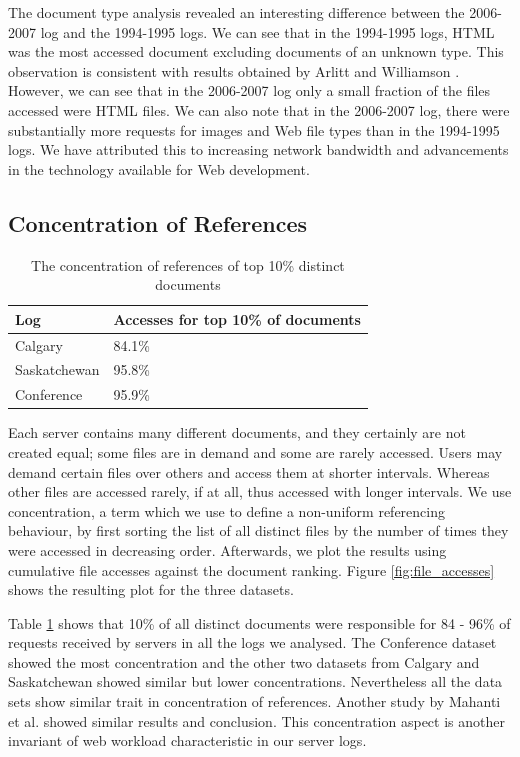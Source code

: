 \documentclass[10pt,conference]{IEEEtran}
\begin{document}
The document type analysis revealed an interesting difference between the 2006-2007 log and the 1994-1995 logs. We can see that in the 1994-1995 logs, HTML was the most accessed document excluding documents of an unknown type. This observation is consistent with results obtained by Arlitt and Williamson \cite{keynote}. However, we can see that in the 2006-2007 log only a small fraction of the files accessed were HTML files. We can also note that in the 2006-2007 log, there were substantially more requests for images and Web file types than in the 1994-1995 logs. We have attributed this to increasing network bandwidth and advancements in the technology available for Web development.

\subsection{Concentration of References} %
\label{sub:concentration_of_references}
\begin{table}[h]
    \caption{The concentration of references of top 10\% distinct documents}\label{tab:conc_references}
    \begin{tabular}{l | l}
        Log & Accesses for top 10\% of documents\\
        \hline
        Calgary & 84.1\%\\
        Saskatchewan & 95.8\%\\
        Conference & 95.9\%
    \end{tabular}
\end{table}
Each server contains many different documents, and they certainly are not created equal; some files are in demand and some are rarely accessed. Users may demand certain files over others and access them at shorter intervals. Whereas other files are accessed rarely, if at all, thus accessed with longer intervals. We use concentration, a term which we use to define a non-uniform referencing behaviour, by first sorting the list of all distinct files by the number of times they were accessed in decreasing order. Afterwards, we plot the results using cumulative file accesses against the document ranking. Figure \ref{fig:file_accesses} shows the resulting plot for the three datasets.

Table \ref{tab:conc_references} shows that 10\% of all distinct documents were responsible for 84 - 96\% of requests received by servers in all the logs we analysed. The Conference dataset showed the most concentration and the other two datasets from Calgary and Saskatchewan showed similar but lower concentrations. Nevertheless all the data sets show similar trait in concentration of references. Another study by Mahanti et al.\cite{Mahanti} showed similar results and conclusion. This concentration aspect is another invariant of web workload characteristic in our server logs.
\end{document}
